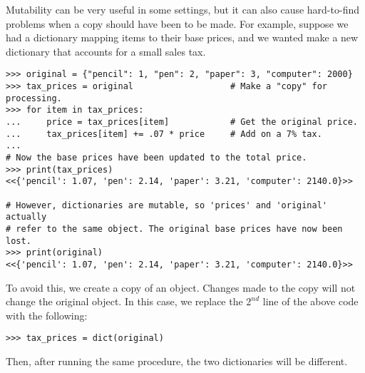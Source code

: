 \begin{warn}
Mutability can be very useful in some settings, but it can also cause hard-to-find problems when a copy should have been to be made.
For example, suppose we had a dictionary mapping items to their base prices, and we wanted make a new dictionary that accounts for a small sales tax.

\begin{lstlisting}
>>> original = {"pencil": 1, "pen": 2, "paper": 3, "computer": 2000}
>>> tax_prices = original                   # Make a "copy" for processing.
>>> for item in tax_prices:
...     price = tax_prices[item]            # Get the original price.
...     tax_prices[item] += .07 * price     # Add on a 7% tax.
...
# Now the base prices have been updated to the total price.
>>> print(tax_prices)
<<{'pencil': 1.07, 'pen': 2.14, 'paper': 3.21, 'computer': 2140.0}>>

# However, dictionaries are mutable, so 'prices' and 'original' actually
# refer to the same object. The original base prices have now been lost.
>>> print(original)
<<{'pencil': 1.07, 'pen': 2.14, 'paper': 3.21, 'computer': 2140.0}>>
\end{lstlisting}

To avoid this, we create a copy of an object.
Changes made to the copy will not change the original object.
In this case, we replace the $2^{nd}$ line of the above code with the following:
\begin{lstlisting}
>>> tax_prices = dict(original)
\end{lstlisting}
Then, after running the same procedure, the two dictionaries will be different.
\end{warn}

